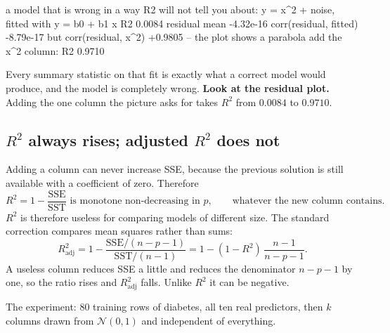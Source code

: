 \documentclass[11pt]{article}
\begin{document}
\begin{codeout}
a model that is wrong in a way R2 will not tell you about:
   y = x^2 + noise, fitted with y = b0 + b1 x
   R2 0.0084   residual mean -4.32e-16   corr(residual, fitted) -8.79e-17
   but corr(residual, x^2) +0.9805  -- the plot shows a parabola
   add the x^2 column: R2 0.9710
\end{codeout}

\begin{keyidea}
Every summary statistic on that fit is exactly what a correct model would
produce, and the model is completely wrong. \textbf{Look at the residual
plot.} Adding the one column the picture asks for takes $R^2$ from $0.0084$ to
$0.9710$.
\end{keyidea}

\subsection{\texorpdfstring{$R^2$ always rises; adjusted $R^2$ does not}{R2 always rises; adjusted R2 does not}}
\label{sec:adjr2}

Adding a column can never increase SSE, because the previous solution is still
available with a coefficient of zero. Therefore
\begin{equation}
  \label{eq:monotone}
  R^2 = 1 - \frac{\mathrm{SSE}}{\mathrm{SST}}
  \text{ is monotone non-decreasing in } p,
  \qquad\text{whatever the new column contains.}
\end{equation}
$R^2$ is therefore useless for comparing models of different size. The
standard correction compares mean squares rather than sums:
\begin{equation}
  \label{eq:adj}
  R^2_{\text{adj}} = 1 - \frac{\mathrm{SSE}/(n-p-1)}{\mathrm{SST}/(n-1)}
                   = 1 - (1-R^2)\,\frac{n-1}{n-p-1}.
\end{equation}
A useless column reduces SSE a little and reduces the denominator $n-p-1$ by
one, so the ratio rises and $R^2_{\text{adj}}$ falls. Unlike $R^2$ it can be
negative.

The experiment: $80$ training rows of diabetes, all ten real predictors, then
$k$ columns drawn from $\mathcal{N}(0,1)$ and independent of everything.
\end{document}
